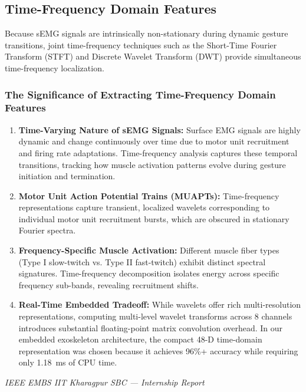 \documentclass[12pt,a4paper]{article}
\begin{document}
\subsection{Time-Frequency Domain Features}

Because sEMG signals are intrinsically non-stationary during dynamic gesture transitions, joint time-frequency techniques such as the Short-Time Fourier Transform (STFT) and Discrete Wavelet Transform (DWT) provide simultaneous time-frequency localization.

\subsubsection{The Significance of Extracting Time-Frequency Domain Features}
\begin{enumerate}[leftmargin=*]
    \item \textbf{Time-Varying Nature of sEMG Signals:} Surface EMG signals are highly dynamic and change continuously over time due to motor unit recruitment and firing rate adaptations. Time-frequency analysis captures these temporal transitions, tracking how muscle activation patterns evolve during gesture initiation and termination.
    \item \textbf{Motor Unit Action Potential Trains (MUAPTs):} Time-frequency representations capture transient, localized wavelets corresponding to individual motor unit recruitment bursts, which are obscured in stationary Fourier spectra.
    \item \textbf{Frequency-Specific Muscle Activation:} Different muscle fiber types (Type I slow-twitch vs. Type II fast-twitch) exhibit distinct spectral signatures. Time-frequency decomposition isolates energy across specific frequency sub-bands, revealing recruitment shifts.
    \item \textbf{Real-Time Embedded Tradeoff:} While wavelets offer rich multi-resolution representations, computing multi-level wavelet transforms across 8 channels introduces substantial floating-point matrix convolution overhead. In our embedded exoskeleton architecture, the compact 48-D time-domain representation was chosen because it achieves 96\%+ accuracy while requiring only 1.18~ms of CPU time.
\end{enumerate}

\vfill
\begin{center}
    \footnotesize\textit{IEEE EMBS IIT Kharagpur SBC --- Internship Report}
\end{center}
\end{document}
